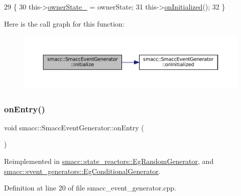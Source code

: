 \begin{DoxyCode}
29     \{
30         this->\hyperlink{classsmacc_1_1SmaccEventGenerator_ac7efdd1d9c69906c3a9d3f66e13bb04a}{ownerState\_} = ownerState;
31         this->\hyperlink{classsmacc_1_1SmaccEventGenerator_a59a90d4c22d02f72522e94ff71b14d10}{onInitialized}();
32     \}
\end{DoxyCode}
Here is the call graph for this function\+:
\nopagebreak
\begin{figure}[H]
\begin{center}
\leavevmode
\includegraphics[width=350pt]{classsmacc_1_1SmaccEventGenerator_a804f2d42ef9a834a2729376de2f2f4e4_cgraph}
\end{center}
\end{figure}
\mbox{\label{classsmacc_1_1SmaccEventGenerator_aa1eb9cc0fd1b3e83cc87d4871fb0f68a}} 
\subsubsection{\texorpdfstring{on\+Entry()}{onEntry()}}
{\footnotesize\ttfamily void smacc\+::\+Smacc\+Event\+Generator\+::on\+Entry (\begin{DoxyParamCaption}{ }\end{DoxyParamCaption})\hspace{0.3cm}{\ttfamily [virtual]}}



Reimplemented in \hyperlink{classsmacc_1_1state__reactors_1_1EgRandomGenerator_aec89532c1b53e42e5d9006eddfea10e6}{smacc\+::state\+\_\+reactors\+::\+Eg\+Random\+Generator}, and \hyperlink{classsmacc_1_1event__generators_1_1EgConditionalGenerator_ae3413453dceeabdf20cba6f1f19fc40c}{smacc\+::event\+\_\+generators\+::\+Eg\+Conditional\+Generator}.



Definition at line 20 of file smacc\+\_\+event\+\_\+generator.\+cpp.


